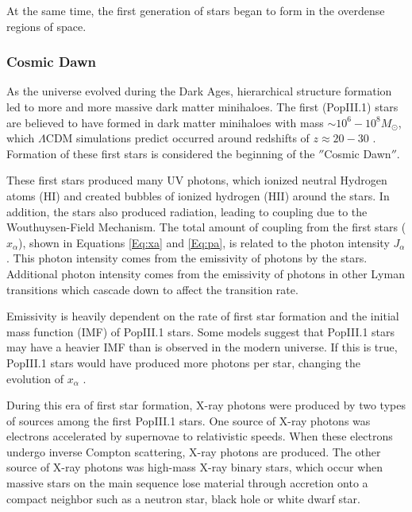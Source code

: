 At the same time, the first generation of stars began to form in the overdense regions of space. 

\subsubsection{Cosmic Dawn}

As the universe evolved during the Dark Ages, hierarchical structure formation led to more and more massive dark matter minihaloes. The first (PopIII.1) stars are believed to have formed in dark matter minihaloes with mass $\sim 10^6 - 10^8 M_{\odot}$, which $\Lambda$CDM simulations predict occurred around redshifts of $z \approx 20-30$ \cite{bromm_2013}. Formation of these first stars is considered the beginning of the $''$Cosmic Dawn$''$. 


These first stars produced many UV photons, which ionized neutral Hydrogen atoms (HI) and created bubbles of ionized hydrogen (HII) around the stars. In addition, the stars also produced \lya  radiation, leading to coupling due to the Wouthuysen-Field Mechanism. The total amount of coupling from the first stars ($x_\alpha$), shown in Equations \ref{Eq:xa} and \ref{Eq:pa}, is related to the \lya  photon intensity $J_\alpha$. This photon intensity comes from the emissivity of \lya photons by the stars. Additional photon intensity comes from the emissivity of photons in other Lyman transitions which cascade down to affect the \lya  transition rate. 

Emissivity is heavily dependent on the rate of first star formation and the initial mass function (IMF) of PopIII.1 stars. Some models suggest that PopIII.1 stars may have a heavier IMF than is observed in the modern universe. If this is true, PopIII.1 stars would have produced more \lya  photons per star, changing the evolution of $x_\alpha$ \cite{natarajan_2014}. 

During this era of first star formation, X-ray photons were produced by two types of sources among the first PopIII.1 stars. One source of X-ray photons was electrons accelerated by supernovae to relativistic speeds. When these electrons undergo inverse Compton scattering, X-ray photons are produced. The other source of X-ray photons was high-mass X-ray binary stars, which occur when massive stars on the main sequence lose material through accretion onto a compact neighbor such as a neutron star, black hole or white dwarf star. 

